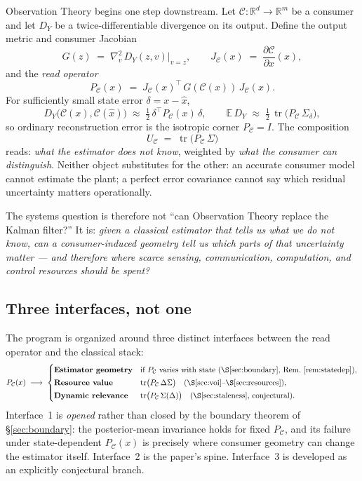 \documentclass{article}
\theoremstyle{definition}
\theoremstyle{remark}
\newcommand{\E}{\mathbb{E}}
\newcommand{\R}{\mathbb{R}}
\newcommand{\PC}{P_{\mathcal{C}}}
\newcommand{\tr}{\operatorname{tr}}
\newcommand{\C}{\mathcal{C}}
\newcommand{\Sig}{\Sigma}
\newcommand{\UC}{U_{\mathcal{C}}}
\begin{document}
Observation Theory begins one step downstream. Let $\C:\R^d\to\R^m$ be a
consumer and let $D_Y$ be a twice-differentiable divergence on its output.
Define the output metric and consumer Jacobian
\begin{equation}
G(z)\;=\;\nabla_v^2\,D_Y(z,v)\big|_{v=z},
\qquad
J_\C(x)\;=\;\frac{\partial \C}{\partial x}(x),
\end{equation}
and the \emph{read operator}
\begin{equation}
\label{eq:pullback}
\boxed{\;\PC(x)\;=\;J_\C(x)^{\top}\,G(\C(x))\,J_\C(x).\;}
\end{equation}
For sufficiently small state error $\delta=x-\hat x$,
\begin{equation}
D_Y\!\big(\C(x),\C(\hat x)\big)\;\approx\;\tfrac12\,\delta^{\top}\PC(x)\,\delta,
\qquad
\E\,D_Y \;\approx\; \tfrac12\,\tr\!\big(\PC\,\Sig_\delta\big),
\end{equation}
so ordinary reconstruction error is the isotropic corner $\PC=I$. The
composition
\begin{equation}
\label{eq:composition}
\UC \;=\; \tr\!\big(\PC\,\Sig\big)
\end{equation}
reads: \emph{what the estimator does not know}, weighted by \emph{what the
consumer can distinguish}. Neither object substitutes for the other: an
accurate consumer model cannot estimate the plant; a perfect error covariance
cannot say which residual uncertainty matters operationally.

The systems question is therefore not ``can Observation Theory replace the
Kalman filter?'' It is: \emph{given a classical estimator that tells us what
we do not know, can a consumer-induced geometry tell us which parts of that
uncertainty matter --- and therefore where scarce sensing, communication,
computation, and control resources should be spent?}

\subsection{Three interfaces, not one}
\label{sec:interfaces}

The program is organized around three distinct interfaces between the read
operator and the classical stack:
\begin{equation}
\label{eq:threeinterfaces}
\PC(x)\;\longrightarrow\;
\begin{cases}
\textbf{Estimator geometry} & \text{if $\PC$ varies with state
  (\S\ref{sec:boundary}, Rem.~\ref{rem:statedep})},\\[2pt]
\textbf{Resource value} & \tr\!\big(\PC\,\Delta\Sig\big)
  \quad\text{(\S\ref{sec:voi}--\S\ref{sec:resources})},\\[2pt]
\textbf{Dynamic relevance} & \tr\!\big(\PC\,\Sig(\Delta)\big)
  \quad\text{(\S\ref{sec:staleness}, conjectural)}.
\end{cases}
\end{equation}
Interface~1 is \emph{opened} rather than closed by the boundary theorem of
\S\ref{sec:boundary}: the posterior-mean invariance holds for fixed $\PC$,
and its failure under state-dependent $\PC(x)$ is precisely where consumer
geometry can change the estimator itself. Interface~2 is the paper's spine.
Interface~3 is developed as an explicitly conjectural branch.
\end{document}
